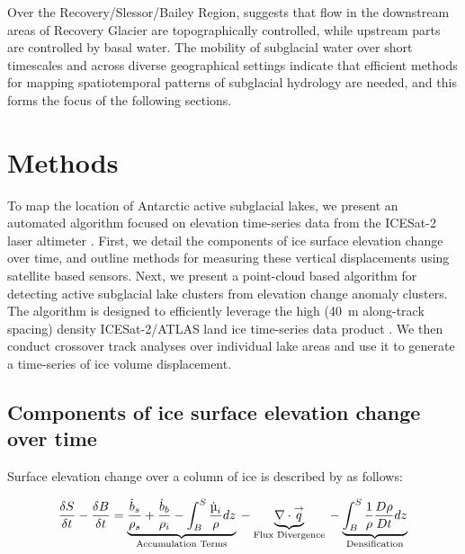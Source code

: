 Over the Recovery/Slessor/Bailey Region, \citet{DiezBasalSettingsControl2018} suggests that flow in the downstream areas of Recovery Glacier are topographically controlled, while upstream parts are controlled by basal water.
The mobility of subglacial water over short timescales and across diverse geographical settings indicate that efficient methods for mapping spatiotemporal patterns of subglacial hydrology are needed, and this forms the focus of the following sections.


\section{Methods}

To map the location of Antarctic active subglacial lakes, we present an automated algorithm focused on elevation time-series data from the ICESat-2 laser altimeter \citep{MarkusIceCloudland2017,NeumannIceCloudLand2019}.
First, we detail the components of ice surface elevation change over time, and outline methods for measuring these vertical displacements using satellite based sensors.
Next, we present a point-cloud based algorithm for detecting active subglacial lake clusters from elevation change anomaly clusters.
The algorithm is designed to efficiently leverage the high (\SI{40}{m} along-track spacing) density ICESat-2/ATLAS land ice time-series data product \citep[ATL11;][]{SmithATLASICESat2L3B2021}.
We then conduct crossover track analyses over individual lake areas and use it to generate a time-series of ice volume displacement.

\clearpage
\subsection{Components of ice surface elevation change over time} \label{sec:componentsofdhdt}

Surface elevation change over a column of ice is described by \citet[][,p.335]{Cuffeyphysicsglaciers2010} as follows:

\begin{equation}
  \frac{\delta S}{\delta t}-\frac{\delta B}{\delta t} \\
  = \underbrace{ \frac{\dot{b}_s}{\rho_s} + \frac{\dot{b}_b}{\rho_i} - \int_{B}^{S}\frac{\dot{\mu}_i}{\rho} dz }_{\text{Accumulation Terms}} \\
  - \underbrace{\nabla\cdot \overset{\rightarrow}{q}}_{\text{Flux Divergence}} \\
  - \underbrace{\int_{B}^{S} \frac{1}{\rho}\frac{D\rho}{Dt}dz }_{\text{Densification}} \\
  \label{eq:4.1}
\end{equation}

